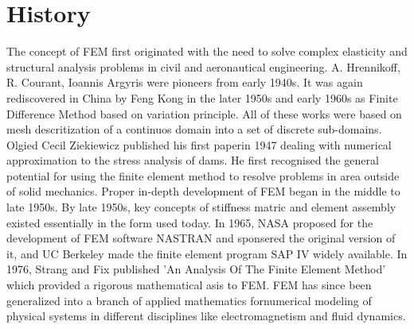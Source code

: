 \section{\bf{History}}
The concept of FEM first originated with the need to solve complex elasticity and structural analysis problems in civil and aeronautical engineering.  A. Hrennikoff\cite{hrennikoff1941solution}, R. Courant\cite{courant1943variational}, Ioannis Argyris\cite{bandela2020finite} were pioneers from early 1940s. It was again rediscovered in China by Feng Kong  in the later 1950s and early 1960s as Finite Difference Method based on variation principle. All of these works were based on mesh descritization of a continuos domain into a set of discrete sub-domains.
	Olgied Cecil Ziekiewicz\cite{stein2009olgierd} published his first paperin 1947 dealing with numerical approximation to the stress analysis of dams. He first recognised the general potential for using the finite element method to resolve problems in area outside of solid mechanics. 
	Proper in-depth development of FEM began in the middle to late 1950s. By late 1950s, key concepts of stiffness matric and element assembly existed essentially in the form used today. In 1965, NASA proposed for the development of FEM software NASTRAN and sponsered the original version of it, and UC Berkeley made the finite element program SAP IV widely available. 
	In 1976, Strang and Fix\cite{strang1973analysis} published 'An Analysis Of The Finite Element Method' which provided a rigorous mathematical asis to FEM. FEM has since been generalized into a branch of applied mathematics fornumerical modeling of physical systems in different disciplines like electromagnetism and fluid dynamics\cite{zienkiewicz2005finite}\cite{banakh2022oscillations}.




